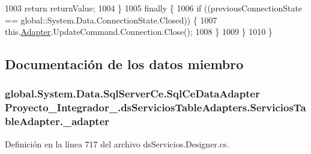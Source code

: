 \begin{DoxyCode}
1003                 \textcolor{keywordflow}{return} returnValue;
1004             \}
1005             \textcolor{keywordflow}{finally} \{
1006                 \textcolor{keywordflow}{if} ((previousConnectionState == global::System.Data.ConnectionState.Closed)) \{
1007                     this.\hyperlink{class_proyecto___integrador__3_1_1ds_servicios_table_adapters_1_1_servicios_table_adapter_a6e2d84a1b2c925ab5f078c403b1e3ecf}{Adapter}.UpdateCommand.Connection.Close();
1008                 \}
1009             \}
1010         \}
\end{DoxyCode}


\subsection{Documentación de los datos miembro}
\hypertarget{class_proyecto___integrador__3_1_1ds_servicios_table_adapters_1_1_servicios_table_adapter_adef36d1c06bafba740cd2cb94515689b}{
\subsubsection[{\-\_\-adapter}]{\setlength{\rightskip}{0pt plus 5cm}global.\-System.\-Data.\-Sql\-Server\-Ce.\-Sql\-Ce\-Data\-Adapter Proyecto\-\_\-\-Integrador\-\_.\-ds\-Servicios\-Table\-Adapters.\-Servicios\-Table\-Adapter.\-\_\-adapter\hspace{0.3cm}{\ttfamily [private]}}}\label{class_proyecto___integrador__3_1_1ds_servicios_table_adapters_1_1_servicios_table_adapter_adef36d1c06bafba740cd2cb94515689b}


Definición en la línea 717 del archivo ds\-Servicios.\-Designer.\-cs.

